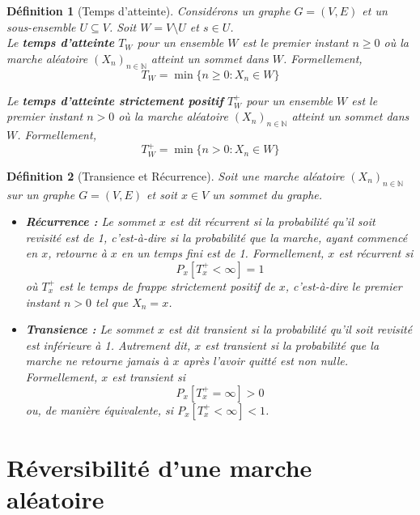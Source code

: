 \documentclass{article}
\theoremstyle{pasdepoint}
\newtheorem{definition}{Définition}
\theoremstyle{break}
\theoremstyle{pasdepoint}
\begin{document}
\begin{definition}[Temps d'atteinte]
    Considérons un graphe \( G = (V, E) \) et un sous-ensemble \( U \subseteq V \). Soit \( W = V \setminus U \) et \( s \in U \).\\

    Le \textbf{temps d'atteinte} \( T_W \) pour un ensemble \( W \) est le premier instant \( n \geq 0 \) où la marche aléatoire \( (X_n)_{n\in\mathbb{N}} \) atteint un sommet dans \( W \). Formellement, 
    \[
    T_W = \min\{n \geq 0 : X_n \in W\}
    \]

    Le \textbf{temps d'atteinte strictement positif} \(T_W^+\) pour un ensemble \( W \) est le premier instant \( n > 0 \) où la marche aléatoire \( (X_n)_{n\in\mathbb{N}} \) atteint un sommet dans \( W \). Formellement,
    \[
    T_W^+ = \min\{n > 0 : X_n \in W\}
    \]
\end{definition}

\begin{definition}[Transience et Récurrence]
    Soit une marche aléatoire \( (X_n)_{n \in \mathbb{N}} \) sur un graphe \( G = (V, E) \) et soit \( x \in V \) un sommet du graphe. 
    
    \begin{itemize}
        \item \textbf{Récurrence :} Le sommet \( x \) est dit \textit{récurrent} si la probabilité qu'il soit revisité est de 1, c'est-à-dire si la probabilité que la marche, ayant commencé en \( x \), retourne à \( x \) en un temps fini est de 1. Formellement, \( x \) est récurrent si
        \[
        P_x[T_x^+ < \infty] = 1
        \]
        où \( T_x^+ \) est le temps de frappe strictement positif de \( x \), c'est-à-dire le premier instant \( n > 0 \) tel que \( X_n = x \).
    
        \item \textbf{Transience :} Le sommet \( x \) est dit \textit{transient} si la probabilité qu'il soit revisité est inférieure à 1. Autrement dit, \( x \) est transient si la probabilité que la marche ne retourne jamais à \( x \) après l'avoir quitté est non nulle. Formellement, \( x \) est transient si
        \[
        P_x[T_x^+ = \infty] > 0
        \]
        ou, de manière équivalente, si \( P_x[T_x^+ < \infty] < 1 \).
    \end{itemize}
\end{definition}

\section{Réversibilité d'une marche aléatoire}
\end{document}
